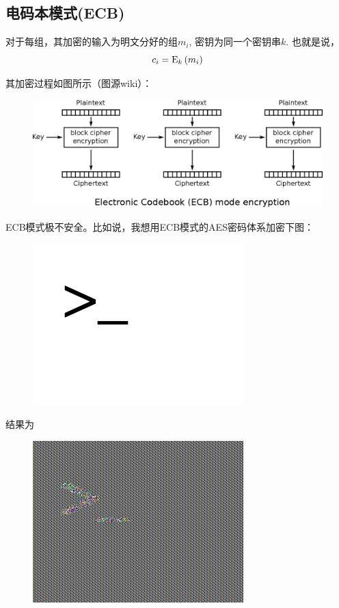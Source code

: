 \subsection{电码本模式(ECB)}
对于每组，其加密的输入为明文分好的组$m_i$, 密钥为同一个密钥串$k$. 也就是说，
\begin{equation}
c_i={\mathrm{E}_{k}\left({m_i}\right)}
\end{equation}

其加密过程如图所示（图源wiki）：
\begin{figure}[H]
\centering
\includegraphics[scale=1]{chapters/chapter_3/ECB.eps}
\end{figure}

ECB模式极不安全。比如说，我想用ECB模式的AES密码体系加密下图：
\begin{figure}[H]
\centering
\includegraphics[scale=0.6]{chapters/chapter_3/ECB_origin.png}
\end{figure}

结果为
\begin{figure}[H]
\centering
\includegraphics[scale=0.4]{chapters/chapter_3/ECB_result.jpeg}
\end{figure}
